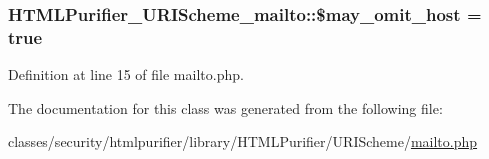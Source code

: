 \hypertarget{classHTMLPurifier__URIScheme__mailto_a42ffed0793f1dac2002a7ba48a2df7e7}{
\subsubsection[{\$may\+\_\+omit\+\_\+host}]{\setlength{\rightskip}{0pt plus 5cm}H\+T\+M\+L\+Purifier\+\_\+\+U\+R\+I\+Scheme\+\_\+mailto\+::\$may\+\_\+omit\+\_\+host = true}}\label{classHTMLPurifier__URIScheme__mailto_a42ffed0793f1dac2002a7ba48a2df7e7}


Definition at line 15 of file mailto.\+php.



The documentation for this class was generated from the following file\+:\begin{DoxyCompactItemize}
\item 
classes/security/htmlpurifier/library/\+H\+T\+M\+L\+Purifier/\+U\+R\+I\+Scheme/\hyperlink{mailto_8php}{mailto.\+php}\end{DoxyCompactItemize}
